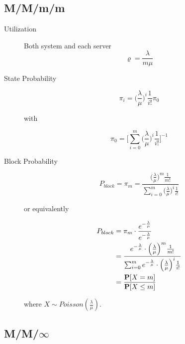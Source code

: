 \subsection{M/M/m/m}

\begin{description}
	
	\item [Utilization]
	Both system and each server
		\begin{equation}
		\varrho = \frac{\lambda}{m\mu}
		\end{equation}
	
	\item [State Probability]
		\begin{equation}
		\pi_{i} = \Big( \frac{\lambda}{\mu} \Big)^{i} \frac{1}{i!} \pi_{0} 
		\end{equation}
		
		with
		
		\begin{equation}
		\pi_{0} = \Big[ \sum_{i=0}^{m} \Big( \frac{\lambda}{\mu} \Big)^{i} \frac{1}{i!} \Big]^{-1}
		\end{equation}	
	
	\item [Block Probability]	
		\begin{equation}
		P_{block} = \pi_{m} = \frac{\Big(\frac{\lambda}{\mu}\Big)^{m} \frac{1}{m!}}{\sum_{i=0}^{m} \Big( \frac{\lambda}{\mu} \Big)^{i} \frac{1}{i!}}
		\end{equation}
		
		or equivalently
		
		\begin{equation}
		\begin{split}
		P_{block} & = \pi_{m} \cdot \frac{e^{-\frac{\lambda}{\mu}}}{e^{-\frac{\lambda}{\mu}}} \\ 
		& = \frac{e^{-\frac{\lambda}{\mu}} \cdot \Big(\frac{\lambda}{\mu}\Big)^{m} \frac{1}{m!}}{\sum_{i=0}^{m} e^{-\frac{\lambda}{\mu}} \cdot \Big( \frac{\lambda}{\mu} \Big)^{i} \frac{1}{i!}} \\
		& = \frac{\mathbf{P}[X = m]}{\mathbf{P}[X \leq m]}
		\end{split}
		\end{equation}
		
		where $X \sim Poisson(\frac{\lambda}{\mu})$.
	
\end{description}

	


\subsection{M/M/\texorpdfstring{$\infty$}{Infinity}}

